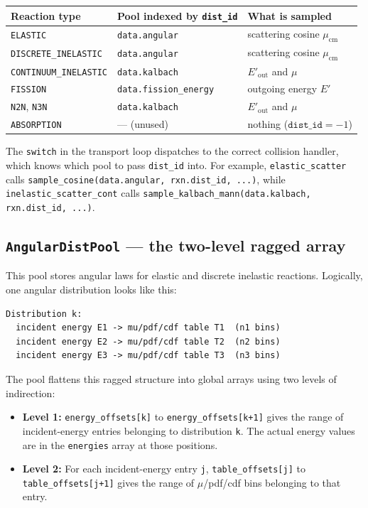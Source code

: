 \documentclass[11pt,a4paper]{article}
\begin{document}
\begin{longtable}{p{4.0cm} p{4.5cm} p{3.5cm}}
\toprule
Reaction type & Pool indexed by \texttt{dist\_id} & What is sampled \\
\midrule
\texttt{ELASTIC} & \texttt{data.angular} & scattering cosine $\mu_\text{cm}$ \\
\texttt{DISCRETE\_INELASTIC} & \texttt{data.angular} & scattering cosine $\mu_\text{cm}$ \\
\texttt{CONTINUUM\_INELASTIC} & \texttt{data.kalbach} & $E'_\text{out}$ and $\mu$ \\
\texttt{FISSION} & \texttt{data.fission\_energy} & outgoing energy $E'$ \\
\texttt{N2N}, \texttt{N3N} & \texttt{data.kalbach} & $E'_\text{out}$ and $\mu$ \\
\texttt{ABSORPTION} & --- (unused) & nothing ($\texttt{dist\_id} = -1$) \\
\bottomrule
\end{longtable}

The \texttt{switch} in the transport loop dispatches to the correct collision handler, which knows which pool to pass \texttt{dist\_id} into. For example, \texttt{elastic\_scatter} calls \texttt{sample\_cosine(data.angular, rxn.dist\_id, ...)}, while \texttt{inelastic\_scatter\_cont} calls \texttt{sample\_kalbach\_mann(data.kalbach, rxn.dist\_id, ...)}.

\subsection{\texttt{AngularDistPool} --- the two-level ragged array}
\label{sec:angular-pool}
This pool stores angular laws for elastic and discrete inelastic reactions. Logically, one angular distribution looks like this:
\begin{lstlisting}
Distribution k:
  incident energy E1 -> mu/pdf/cdf table T1  (n1 bins)
  incident energy E2 -> mu/pdf/cdf table T2  (n2 bins)
  incident energy E3 -> mu/pdf/cdf table T3  (n3 bins)
\end{lstlisting}

The pool flattens this ragged structure into global arrays using two levels of indirection:
\begin{itemize}[leftmargin=1.4em]
  \item \textbf{Level 1:} \texttt{energy\_offsets[k]} to \texttt{energy\_offsets[k+1]} gives the range of incident-energy entries belonging to distribution \texttt{k}. The actual energy values are in the \texttt{energies} array at those positions.
  \item \textbf{Level 2:} For each incident-energy entry \texttt{j}, \texttt{table\_offsets[j]} to \texttt{table\_offsets[j+1]} gives the range of $\mu$/pdf/cdf bins belonging to that entry.
\end{itemize}
\end{document}
